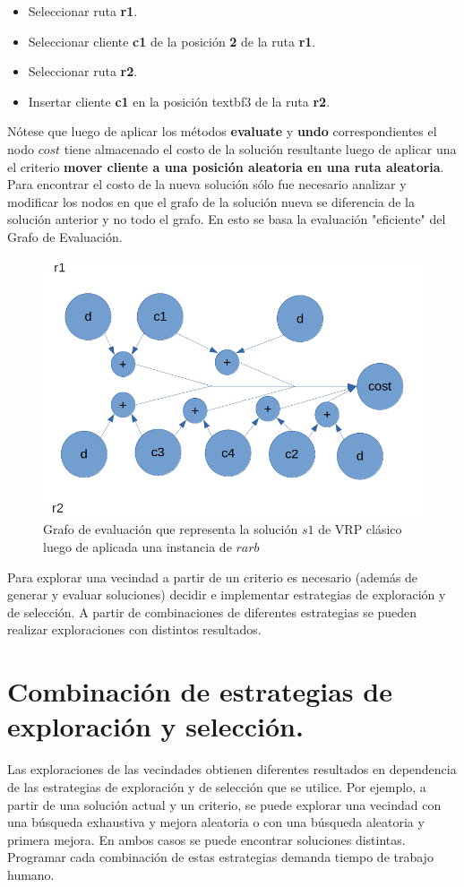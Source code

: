 \begin{itemize}
	\item Seleccionar ruta \textbf{r1}.
	\item Seleccionar cliente \textbf{c1} de la posición \textbf{2} de la ruta \textbf{r1}.
	\item Seleccionar ruta \textbf{r2}.
	\item Insertar cliente \textbf{c1} en la posición textbf{3} de la ruta \textbf{r2}.
\end{itemize}

Nótese que luego de aplicar los métodos \textbf{evaluate} y \textbf{undo} correspondientes el nodo $cost$ tiene almacenado el costo de la solución resultante luego de aplicar una el criterio \textbf{mover cliente a una posición aleatoria en una ruta aleatoria}. Para encontrar el costo de la nueva solución sólo fue necesario analizar y modificar los nodos en que el grafo de la solución nueva se diferencia de la solución anterior y no todo el grafo. En esto se basa la evaluación "eficiente" del Grafo de Evaluación.

\begin{figure}
	\centering
	\includegraphics[width=0.9\linewidth]{Graphics/eval-graph-4}
	\caption{Grafo de evaluación que representa la solución $s1$ de VRP clásico luego de aplicada una instancia de $rarb$}
	\label{fig:eval-graph-4}
\end{figure}

Para explorar una vecindad a partir de un criterio es necesario (además de generar y evaluar soluciones) decidir e implementar estrategias de exploración y de selección. A partir de combinaciones de diferentes estrategias se pueden realizar exploraciones con distintos resultados.


\section{Combinación de estrategias de exploración y selección.}\label{2-Heidy}
Las exploraciones de las vecindades obtienen diferentes resultados en dependencia de las estrategias de exploración y de selección que se utilice. Por ejemplo, a partir de una solución actual y un criterio, se puede explorar una vecindad con una búsqueda exhaustiva y mejora aleatoria o con una búsqueda aleatoria y primera mejora. En ambos casos se puede encontrar soluciones distintas. Programar cada combinación de estas estrategias demanda tiempo de trabajo humano.


